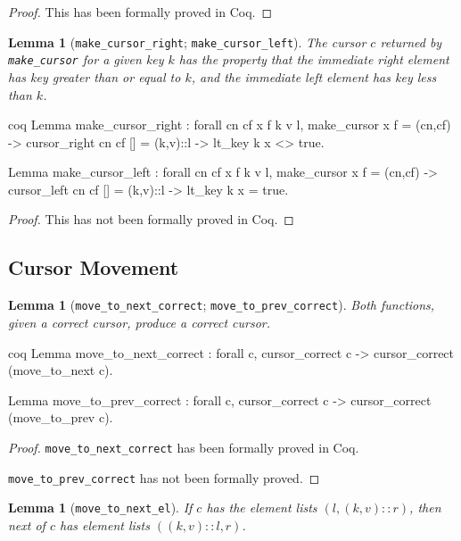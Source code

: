 \documentclass[12pt]{article}
\newtheorem{lemma}[theorem]{Lemma}
\newcommand{\nocontentsline}[3]{}
\newcommand{\tocless}[2]{\bgroup\let\addcontentsline=\nocontentsline#1{#2}\egroup}
\begin{document}
\begin{appendices}
\begin{singlespace}
\begin{proof}
This has been formally proved in Coq.
\end{proof}

\begin{lemma}[\texttt{make\_cursor\_right}; \texttt{make\_cursor\_left}]
The cursor $c$ returned by \texttt{make\_cursor} for a given key $k$ has the property that the immediate right element has key greater than or equal to $k$, and the immediate left element has key less than $k$.
\end{lemma}

\begin{cminted}{coq}
Lemma make_cursor_right : forall cn cf x f k v l,
  make_cursor x f = (cn,cf) ->
  cursor_right cn cf [] = (k,v)::l ->
  lt_key k x <> true.

Lemma make_cursor_left : forall cn cf x f k v l,
  make_cursor x f = (cn,cf) ->
  cursor_left cn cf [] = (k,v)::l ->
  lt_key k x = true.
\end{cminted}

\begin{proof}
This has not been formally proved in Coq.
\end{proof}

\tocless\subsection{Cursor Movement}

\begin{lemma}[\texttt{move\_to\_next\_correct}; \texttt{move\_to\_prev\_correct}]
Both functions, given a correct cursor, produce a correct cursor.
\end{lemma}

\begin{cminted}{coq}
Lemma move_to_next_correct : forall c,
  cursor_correct c ->
  cursor_correct (move_to_next c).

Lemma move_to_prev_correct : forall c,
  cursor_correct c ->
  cursor_correct (move_to_prev c).
\end{cminted}

\begin{proof}
\texttt{move\_to\_next\_correct} has been formally proved in Coq.

\texttt{move\_to\_prev\_correct} has not been formally proved.
\end{proof}

\begin{lemma}[\texttt{move\_to\_next\_el}]
If $c$ has the element lists $(l,(k,v)::r)$, then next of $c$ has element lists $((k,v)::l,r)$.
\end{lemma}


\end{singlespace}
\end{appendices}
\end{document}
